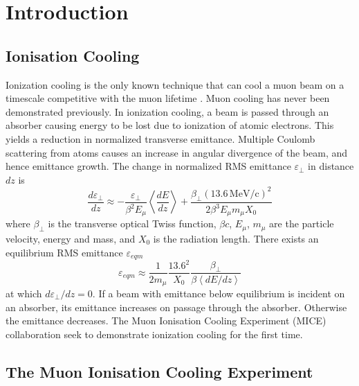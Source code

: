 \section{Introduction}
\label{Sect:Intro}

\subsection{Ionisation Cooling}

Ionization cooling \cite{ionization_cooling} is the only known technique that 
can cool a muon beam on a timescale competitive with the muon lifetime 
\cite{neutrino_factory} \cite{neutrino_factory_2} \cite{muon_collider} 
\cite{muon_collider_2}. Muon cooling has never been demonstrated previously. In 
ionization cooling, a beam is passed through an absorber causing energy to be 
lost due to ionization of atomic electrons. This yields a reduction in 
normalized transverse emittance. Multiple Coulomb scattering from atoms causes 
an increase in angular divergence of the beam, and hence emittance growth. The 
change in normalized RMS emittance $\varepsilon_\perp$ in distance $dz$ is 
\cite{ionization_cooling}
\begin{equation}
\label{eq:depsdz}
\frac{d\varepsilon_{\perp}}{dz} \approx 
    - \frac{\varepsilon_\perp}{\beta^2 E_\mu} \left<\frac{dE}{dz}\right> 
    + \frac{\beta_\perp (13.6\,\mathrm{MeV/c})^2}{2 \beta^3 E_\mu m_\mu X_0}
\end{equation}
where $\beta_\perp$ is the transverse optical Twiss function, $\beta c$, 
$E_\mu$, $m_\mu$ are the particle velocity, energy and mass, and $X_0$ is the 
radiation length. There exists an equilibrium RMS emittance $\varepsilon_{eqm}$
\begin{equation}
\varepsilon_{eqm} \approx \frac{1}{2m_\mu} \frac{13.6^2}{X_0} \frac{\beta_\perp}{\beta \left<dE/dz\right>}
\label{eq:eqm_emittance}
\end{equation}
at which $d\varepsilon_{\perp}/dz = 0$. If a beam with emittance below 
equilibrium is incident on an absorber, its emittance increases on passage 
through the absorber. Otherwise the emittance decreases. The Muon Ionisation
Cooling Experiment (MICE) collaboration seek to demonstrate ionization cooling 
for the first time.

\subsection{The Muon Ionisation Cooling Experiment}

